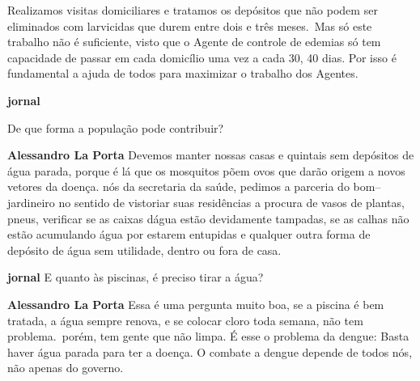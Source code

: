\documentclass[12pt]{memoir}
\newenvironment{Entrevista}{\par
\textbf{jornal}}{\par
\textbf{Alessandro La Porta}}
\begin{document}
Realizamos visitas domiciliares e tratamos os depósitos que não podem ser eliminados com larvicidas que durem entre dois e três meses.\ Mas só este trabalho não é suficiente, visto que o Agente de controle de edemias só tem capacidade de passar em cada domicílio uma vez a cada 30, 40 dias. Por isso é fundamental a ajuda de todos para maximizar o trabalho dos Agentes.\\
\begin{Entrevista}
 
De que forma a população pode contribuir?\\
\end{Entrevista}
Devemos manter nossas casas e quintais sem depósitos de água parada, porque é lá que os mosquitos põem ovos que darão origem a novos vetores da doença. nós da secretaria da saúde, pedimos a parceria do bom--jardineiro no sentido de vistoriar suas residências a procura de vasos de plantas, pneus, verificar se as caixas dágua estão devidamente tampadas, se as calhas não estão acumulando água por estarem entupidas e qualquer outra forma de depósito de água sem utilidade, dentro ou fora de casa.\\
\begin{Entrevista}
E quanto às piscinas, é preciso tirar a água?\\
\end{Entrevista}
Essa é uma pergunta muito boa, se a piscina é bem tratada, a água sempre renova, e se colocar cloro toda semana, não tem problema.\ porém, tem gente que não limpa. É esse o problema da dengue: Basta haver água parada para ter a doença. O combate a dengue depende de todos nós, não apenas do governo.
\end{document}
